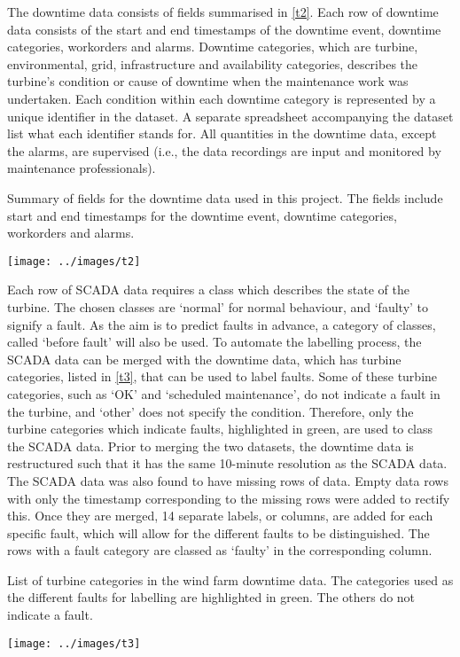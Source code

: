 The downtime data consists of fields summarised in \autoref{t2}. Each row of downtime data consists of the start and end timestamps of the downtime event, downtime categories, workorders and alarms. Downtime categories, which are turbine, environmental, grid, infrastructure and availability categories, describes the turbine's condition or cause of downtime when the maintenance work was undertaken. Each condition within each downtime category is represented by a unique identifier in the dataset. A separate spreadsheet accompanying the dataset list what each identifier stands for. All quantities in the downtime data, except the alarms, are supervised (i.e., the data recordings are input and monitored by maintenance professionals).

\begin{table}
  \centering
  \caption{\label{t2}Summary of fields for the downtime data used in this project. The fields include start and end timestamps for the downtime event, downtime categories, workorders and alarms.}
  \texttt{[image: ../images/t2]}
\end{table}

Each row of SCADA data requires a class which describes the state of the turbine. The chosen classes are `normal' for normal behaviour, and `faulty' to signify a fault. As the aim is to predict faults in advance, a category of classes, called `before fault' will also be used. To automate the labelling process, the SCADA data can be merged with the downtime data, which has turbine categories, listed in \autoref{t3}, that can be used to label faults. Some of these turbine categories, such as `OK' and `scheduled maintenance', do not indicate a fault in the turbine, and `other' does not specify the condition. Therefore, only the turbine categories which indicate faults, highlighted in green, are used to class the SCADA data. Prior to merging the two datasets, the downtime data is restructured such that it has the same 10-minute resolution as the SCADA data. The SCADA data was also found to have missing rows of data. Empty data rows with only the timestamp corresponding to the missing rows were added to rectify this. Once they are merged, 14 separate labels, or columns, are added for each specific fault, which will allow for the different faults to be distinguished. The rows with a fault category are classed as `faulty' in the corresponding column.

\begin{table}
  \centering
  \caption{\label{t3}List of turbine categories in the wind farm downtime data. The categories used as the different faults for labelling are highlighted in green. The others do not indicate a fault.}
  \texttt{[image: ../images/t3]}
\end{table}

